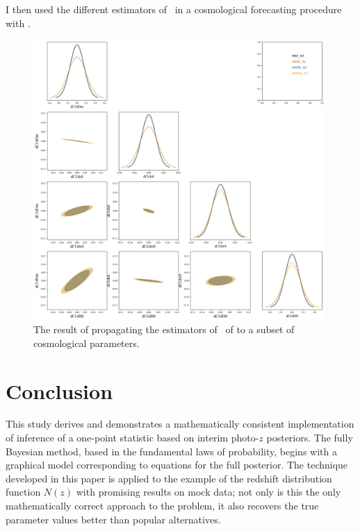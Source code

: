 I then used the different estimators of \nz\ in a cosmological forecasting procedure with \cosmolike.


\begin{figure}
	\begin{center}
		\includegraphics[width=0.99\textwidth]{figures/chippr/final_plot.png}
		\caption{The result of propagating the estimators of \nz\ of  to a subset of cosmological parameters.}
	\end{center}
\end{figure}

\section{Conclusion}

This study derives and demonstrates a mathematically consistent implementation of inference of a one-point statistic based on interim photo-$z$ posteriors.  
The fully Bayesian method, based in the fundamental laws of probability, begins with a graphical model corresponding to equations for the full posterior.  
The technique developed in this paper is applied to the example of the redshift distribution function $N(z)$ with promising results on mock data; not only is this the only mathematically correct approach to the problem, it also recovers the true parameter values better than popular alternatives.  

